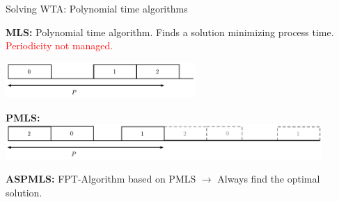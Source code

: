 \documentclass[10 pt]{beamer}
\begin{document}
\begin{frame}{Solving WTA: Polynomial time algorithms}

  
   \textbf{MLS:}  Polynomial time algorithm. Finds a solution minimizing process time. 
   \pause
   \textcolor{red}{Periodicity not managed.}      


   \pause 
 

   \includegraphics[width=0.54\textwidth]{pmls.pdf}
\pause

  \textbf{PMLS:} 
\includegraphics[width=0.9\textwidth]{pmls2.pdf}

 

   \textbf{ASPMLS:} FPT-Algorithm based on PMLS $\rightarrow$ Always find the optimal solution.

\end{frame}
\end{document}
